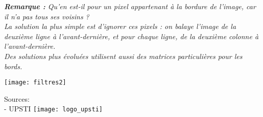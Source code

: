 \textit{\textbf{Remarque :} Qu'en est-il pour un pixel appartenant à la bordure de l'image,
car il n'a pas tous ses voisins ?\\
La solution la plus simple est d'ignorer ces pixels : on balaye l'image de la deuxième ligne à l'avant-dernière, et pour chaque 
ligne, de la deuxième colonne à l'avant-dernière. \\ Des solutions plus évoluées utilisent aussi des matrices particulières pour les bords.}
%
\begin{center}
{\texttt{[image: filtres2]}}
\end{center}

 \vspace{5cm}Sources:\\
- UPSTI \texttt{[image: logo\_upsti]} 
 
